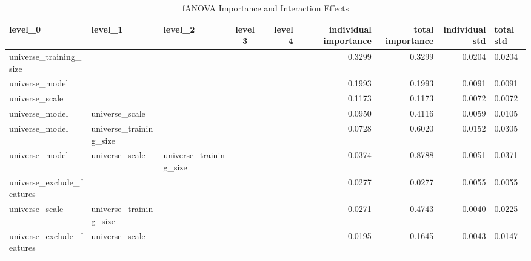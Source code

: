 \begin{table}
\centering
\caption{fANOVA Importance and Interaction Effects}
\label{tab:fanova_importance}
\begin{tabular}{llllrrrr}
\toprule
                   level_0 &                    level_1 &                level_2 &                level_3 &                level_4 & individual importance & total importance & individual std & total std \\
\midrule
    universe_training_size &                            &                        &                        &                        &                0.3299 &           0.3299 &         0.0204 &    0.0204 \\
            universe_model &                            &                        &                        &                        &                0.1993 &           0.1993 &         0.0091 &    0.0091 \\
            universe_scale &                            &                        &                        &                        &                0.1173 &           0.1173 &         0.0072 &    0.0072 \\
            universe_model &             universe_scale &                        &                        &                        &                0.0950 &           0.4116 &         0.0059 &    0.0105 \\
            universe_model &     universe_training_size &                        &                        &                        &                0.0728 &           0.6020 &         0.0152 &    0.0305 \\
            universe_model &             universe_scale & universe_training_size &                        &                        &                0.0374 &           0.8788 &         0.0051 &    0.0371 \\
 universe_exclude_features &                            &                        &                        &                        &                0.0277 &           0.0277 &         0.0055 &    0.0055 \\
            universe_scale &     universe_training_size &                        &                        &                        &                0.0271 &           0.4743 &         0.0040 &    0.0225 \\
 universe_exclude_features &             universe_scale &                        &                        &                        &                0.0195 &           0.1645 &         0.0043 &    0.0147 \\

\end{tabular}
\end{table}
